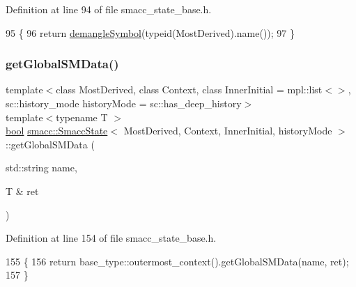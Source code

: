 Definition at line 94 of file smacc\+\_\+state\+\_\+base.\+h.


\begin{DoxyCode}
95   \{
96     \textcolor{keywordflow}{return} \hyperlink{namespacesmacc_1_1introspection_a2f495108db3e57604d8d3ff5ef030302}{demangleSymbol}(\textcolor{keyword}{typeid}(MostDerived).name());
97   \}
\end{DoxyCode}
\mbox{\label{classsmacc_1_1SmaccState_ad53b5be2760eb7ffb50f3b2e542b65f1}} 
\subsubsection{\texorpdfstring{get\+Global\+S\+M\+Data()}{getGlobalSMData()}}
{\footnotesize\ttfamily template$<$class Most\+Derived, class Context, class Inner\+Initial = mpl\+::list$<$$>$, sc\+::history\+\_\+mode history\+Mode = sc\+::has\+\_\+deep\+\_\+history$>$ \\
template$<$typename T $>$ \\
\hyperlink{classbool}{bool} \hyperlink{classsmacc_1_1SmaccState}{smacc\+::\+Smacc\+State}$<$ Most\+Derived, Context, Inner\+Initial, history\+Mode $>$\+::get\+Global\+S\+M\+Data (\begin{DoxyParamCaption}\item[{std\+::string}]{name,  }\item[{T \&}]{ret }\end{DoxyParamCaption})\hspace{0.3cm}{\ttfamily [inline]}}



Definition at line 154 of file smacc\+\_\+state\+\_\+base.\+h.


\begin{DoxyCode}
155   \{
156     \textcolor{keywordflow}{return} base\_type::outermost\_context().getGlobalSMData(name, ret);
157   \}
\end{DoxyCode}
\mbox{\label{classsmacc_1_1SmaccState_a69fc0aa1dbe0c00501f2890616225004}} 

